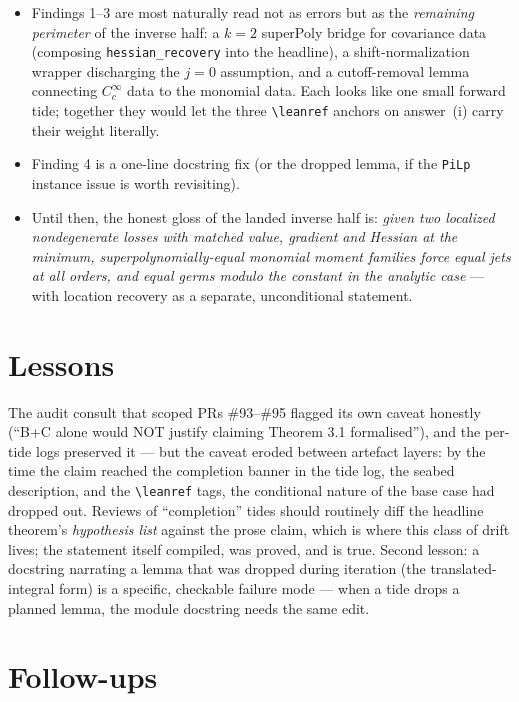 \documentclass[11pt]{article}
\begin{document}
\begin{itemize}[nosep]
\item Findings 1--3 are most naturally read not as errors but as the
\emph{remaining perimeter} of the inverse half: a $k=2$ superPoly bridge for
covariance data (composing \texttt{hessian\_recovery} into the headline), a
shift-normalization wrapper discharging the $j=0$ assumption, and a
cutoff-removal lemma connecting $C_c^\infty$ data to the monomial data. Each
looks like one small forward tide; together they would let the three
\verb|\leanref| anchors on answer~(i) carry their weight literally.
\item Finding 4 is a one-line docstring fix (or the dropped lemma, if the
\texttt{PiLp} instance issue is worth revisiting).
\item Until then, the honest gloss of the landed inverse half is: \emph{given
two localized nondegenerate losses with matched value, gradient and Hessian
at the minimum, superpolynomially-equal monomial moment families force equal
jets at all orders, and equal germs modulo the constant in the analytic
case} --- with location recovery as a separate, unconditional statement.
\end{itemize}

\section{Lessons}

The audit consult that scoped PRs \#93--\#95 flagged its own caveat honestly
(``B+C alone would NOT justify claiming Theorem 3.1 formalised''), and the
per-tide logs preserved it --- but the caveat eroded between artefact layers:
by the time the claim reached the completion banner in the tide log, the
seabed description, and the \verb|\leanref| tags, the conditional nature of
the base case had dropped out. Reviews of ``completion'' tides should
routinely diff the headline theorem's \emph{hypothesis list} against the
prose claim, which is where this class of drift lives; the statement itself
compiled, was proved, and is true. Second lesson: a docstring narrating a
lemma that was dropped during iteration (the translated-integral form) is a
specific, checkable failure mode --- when a tide drops a planned lemma, the
module docstring needs the same edit.

\section{Follow-ups}
\end{document}
